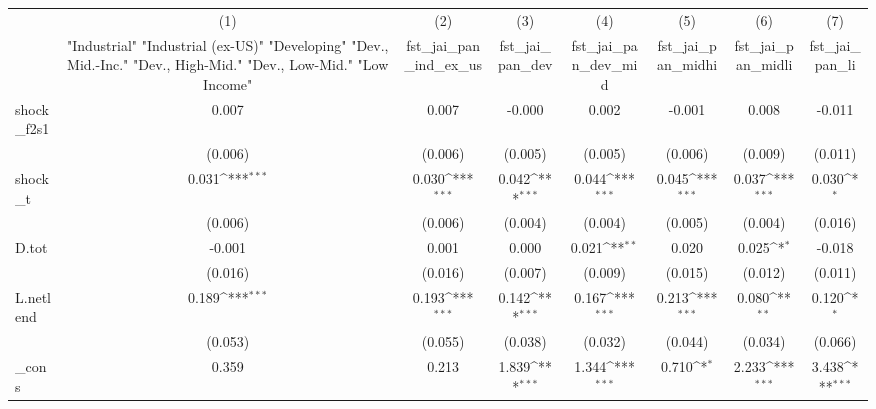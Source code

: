 {
\def\sym#1{\ifmmode^{#1}\else\(^{#1}\)\fi}
\begin{tabular}{l*{7}{c}}
\toprule
            &\multicolumn{1}{c}{(1)}&\multicolumn{1}{c}{(2)}&\multicolumn{1}{c}{(3)}&\multicolumn{1}{c}{(4)}&\multicolumn{1}{c}{(5)}&\multicolumn{1}{c}{(6)}&\multicolumn{1}{c}{(7)}\\
            &\multicolumn{1}{c}{ "Industrial" "Industrial (ex-US)" "Developing" "Dev., Mid.-Inc." "Dev., High-Mid."  "Dev., Low-Mid." "Low Income" }&\multicolumn{1}{c}{fst\_jai\_pan\_ind\_ex\_us}&\multicolumn{1}{c}{fst\_jai\_pan\_dev}&\multicolumn{1}{c}{fst\_jai\_pan\_dev\_mid}&\multicolumn{1}{c}{fst\_jai\_pan\_midhi}&\multicolumn{1}{c}{fst\_jai\_pan\_midli}&\multicolumn{1}{c}{fst\_jai\_pan\_li}\\
\midrule
shock\_f2s1  &       0.007         &       0.007         &      -0.000         &       0.002         &      -0.001         &       0.008         &      -0.011         \\
            &     (0.006)         &     (0.006)         &     (0.005)         &     (0.005)         &     (0.006)         &     (0.009)         &     (0.011)         \\
\addlinespace
shock\_t     &       0.031\sym{***}&       0.030\sym{***}&       0.042\sym{***}&       0.044\sym{***}&       0.045\sym{***}&       0.037\sym{***}&       0.030\sym{*}  \\
            &     (0.006)         &     (0.006)         &     (0.004)         &     (0.004)         &     (0.005)         &     (0.004)         &     (0.016)         \\
\addlinespace
D.tot       &      -0.001         &       0.001         &       0.000         &       0.021\sym{**} &       0.020         &       0.025\sym{*}  &      -0.018         \\
            &     (0.016)         &     (0.016)         &     (0.007)         &     (0.009)         &     (0.015)         &     (0.012)         &     (0.011)         \\
\addlinespace
L.netlend   &       0.189\sym{***}&       0.193\sym{***}&       0.142\sym{***}&       0.167\sym{***}&       0.213\sym{***}&       0.080\sym{**} &       0.120\sym{*}  \\
            &     (0.053)         &     (0.055)         &     (0.038)         &     (0.032)         &     (0.044)         &     (0.034)         &     (0.066)         \\
\addlinespace
\_cons      &       0.359         &       0.213         &       1.839\sym{***}&       1.344\sym{***}&       0.710\sym{*}  &       2.233\sym{***}&       3.438\sym{***}\\

\end{tabular}}

